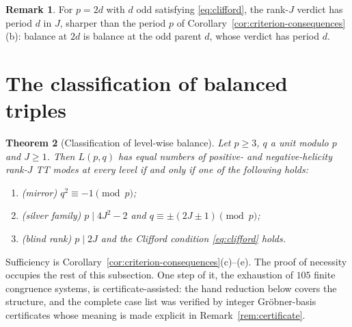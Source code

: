 \documentclass[11pt]{article}
\newtheorem{theorem}{Theorem}[section]
\theoremstyle{definition}
\newtheorem{remark}[theorem]{Remark}
\begin{document}
\begin{remark}
For $p=2d$ with $d$ odd satisfying \eqref{eq:clifford}, the rank-$J$
verdict has period $d$ in $J$, sharper than the period $p$ of
Corollary~\ref{cor:criterion-consequences}(b): balance at $2d$ is balance
at the odd parent $d$, whose verdict has period $d$.
\end{remark}

\section{The classification of balanced triples}
\label{sec:classification}

\begin{theorem}[Classification of level-wise balance]
\label{thm:classification}
Let $p\geq3$, $q$ a unit modulo $p$ and $J\geq1$.  Then $L(p,q)$ has
equal numbers of positive- and negative-helicity rank-$J$ TT modes at
every level if and only if one of the following holds:
\begin{enumerate}[label=(\alph*)]
\item \textup{(mirror)} $q^2\equiv-1\pmod p$;
\item \textup{(silver family)} $p\mid4J^2-2$ and $q\equiv\pm(2J\pm1)\pmod p$;
\item \textup{(blind rank)} $p\mid2J$ and the Clifford condition
\eqref{eq:clifford} holds.
\end{enumerate}
\end{theorem}

Sufficiency is Corollary~\ref{cor:criterion-consequences}(c)--(e).  The
proof of necessity occupies the rest of this subsection.  One step of it,
the exhaustion of $105$ finite congruence systems, is certificate-assisted:
the hand reduction below covers the structure, and the complete case list
was verified by integer Gr\"obner-basis certificates whose meaning is made
explicit in Remark~\ref{rem:certificate}.
\end{document}
